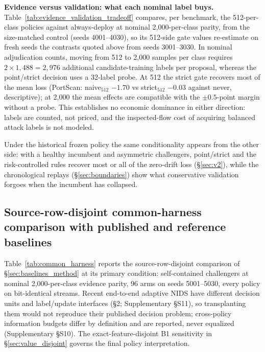 \documentclass[a4paper,fleqn]{cas-sc}
\begin{document}
\textbf{Evidence versus validation: what each nominal label buys.} Table~\ref{tab:evidence_validation_tradeoff} compares, per benchmark, the 512-per-class policies against always-deploy at nominal 2{,}000-per-class parity, from the size-matched control (seeds 4001--4030), so its 512-side gate values re-estimate on fresh seeds the contrasts quoted above from seeds 3001--3030. In nominal adjudication counts, moving from 512 to 2{,}000 samples per class requires $2\times1{,}488 = 2{,}976$ additional candidate-training labels per proposal, whereas the point/strict decision uses a 32-label probe. At 512 the strict gate recovers most of the mean loss (PortScan: naive$_{512}$ $-1.70$ vs strict$_{512}$ $-0.03$ against never, descriptive); at 2{,}000 the mean effects are compatible with the $\pm0.5$-point margin without a probe. This establishes no economic dominance in either direction: labels are counted, not priced, and the inspected-flow cost of acquiring balanced attack labels is not modeled.



Under the historical frozen policy the same conditionality appears from the other side: with a healthy incumbent and asymmetric challengers, point/strict and the risk-controlled rules recover most or all of the zero-drift loss (\S\ref{sec:v2}), while the chronological replays (\S\ref{sec:boundaries}) show what conservative validation forgoes when the incumbent has collapsed.

\subsection{Source-row-disjoint common-harness comparison with published and reference baselines}
\label{sec:baselines}

Table~\ref{tab:common_harness} reports the source-row-disjoint comparison of \S\ref{sec:baselines_method} at its primary condition: self-contained challengers at nominal 2{,}000-per-class evidence parity, 96 arms on seeds 5001--5030, every policy on bit-identical streams. Recent end-to-end adaptive NIDS have different decision units and label/update interfaces (\S2; Supplementary \S S11), so transplanting them would not reproduce their published decision problem; cross-policy information budgets differ by definition and are reported, never equalized (Supplementary \S S10). The exact-feature-disjoint B1 sensitivity in \S\ref{sec:value_disjoint} governs the final policy interpretation.
\end{document}
